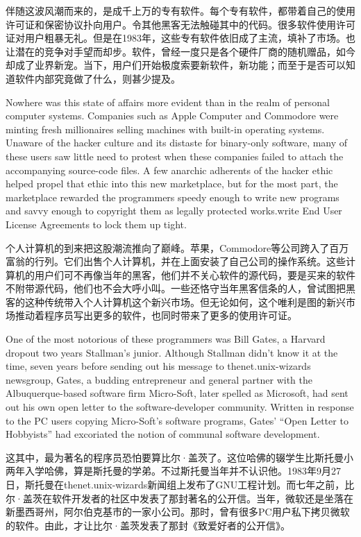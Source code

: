 \ifdefined\chs
伴随这波风潮而来的，是成千上万的专有软件。每个专有软件，都带着自己的使用许可证和保密协议扑向用户。令其他黑客无法触碰其中的代码。很多软件使用许可证对用户粗暴无礼。但是在1983年，这些专有软件依旧成了主流，填补了市场。也让潜在的竞争对手望而却步。软件，曾经一度只是各个硬件厂商的随机赠品，如今却成了业界新宠。当下，用户们开始极度索要新软件，新功能；而至于是否可以知道软件内部究竟做了什么，则甚少提及。
\fi

\ifdefined\eng
Nowhere was this state of affairs more evident than in the realm of personal computer systems. Companies such as Apple Computer and Commodore were minting fresh millionaires selling machines with built-in operating systems. Unaware of the hacker culture and its distaste for binary-only software, many of these users saw little need to protest when these companies failed to attach the accompanying source-code files. A few anarchic adherents of the hacker ethic helped propel that ethic into this new marketplace, but for the most part, the marketplace rewarded the programmers speedy enough to write new programs and savvy enough to \ifdefined\vone copyright them as legally protected works.\fi\ifdefined\vtwo write End User License Agreements to lock them up tight.\fi
\fi

\ifdefined\chs
个人计算机的到来把这股潮流推向了巅峰。苹果，Commodore等公司跨入了百万富翁的行列。它们出售个人计算机，并在上面安装了自己公司的操作系统。这些计算机的用户们可不再像当年的黑客，他们并不关心软件的源代码，要是买来的软件不附带源代码，他们也不会大呼小叫。一些还恪守当年黑客信条的人，曾试图把黑客的这种传统带入个人计算机这个新兴市场。但无论如何，这个唯利是图的新兴市场推动着程序员写出更多的软件，也同时带来了更多的使用许可证。
\fi

\ifdefined\eng
One of the most notorious of these programmers was Bill Gates, a Harvard dropout two years Stallman's junior. Although Stallman didn't know it at the time, seven years before sending out his message to thenet.unix-wizards newsgroup, Gates, a budding entrepreneur and general partner with the Albuquerque-based software firm Micro-Soft, later spelled as Microsoft, had sent out his own open letter to the software-developer community. Written in response to the PC users copying Micro-Soft's software programs, Gates' ``Open Letter to Hobbyists'' had excoriated the notion of communal software development.
\fi

\ifdefined\chs
这其中，最为著名的程序员恐怕要算比尔·盖茨了。这位哈佛的辍学生比斯托曼小两年入学哈佛，算是斯托曼的学弟。不过斯托曼当年并不认识他。1983年9月27日，斯托曼在thenet.unix-wizards新闻组上发布了GNU工程计划。而七年之前，比尔·盖茨在软件开发者的社区中发表了那封著名的公开信。当年，微软还是坐落在新墨西哥州，阿尔伯克基市的一家小公司。那时，曾有很多PC用户私下拷贝微软的软件。由此，才让比尔·盖茨发表了那封《致爱好者的公开信》。
\fi

